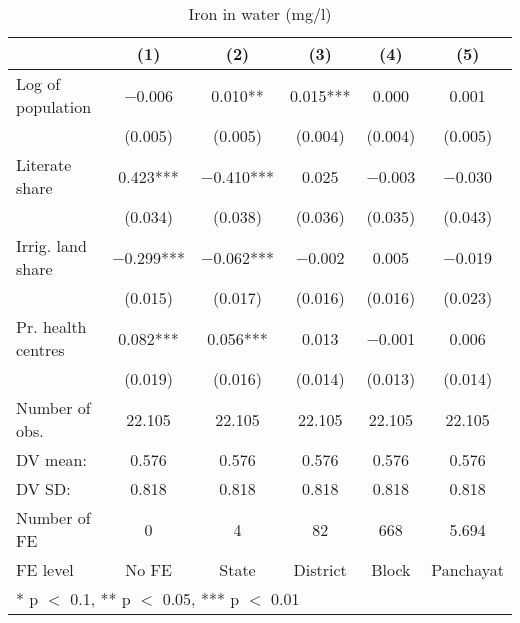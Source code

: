 \begin{table}

\caption{\label{tab:}Iron in water (mg/l)}
\centering
\begin{tabular}[t]{lccccc}
\toprule
  & (1) & (2) & (3) & (4) & (5)\\
\midrule
Log of population & \num{-0.006} & \num{0.010}** & \num{0.015}*** & \num{0.000} & \num{0.001}\\
 & (\num{0.005}) & (\num{0.005}) & (\num{0.004}) & (\num{0.004}) & (\num{0.005})\\
Literate share & \num{0.423}*** & \num{-0.410}*** & \num{0.025} & \num{-0.003} & \num{-0.030}\\
 & (\num{0.034}) & (\num{0.038}) & (\num{0.036}) & (\num{0.035}) & (\num{0.043})\\
Irrig. land share & \num{-0.299}*** & \num{-0.062}*** & \num{-0.002} & \num{0.005} & \num{-0.019}\\
 & (\num{0.015}) & (\num{0.017}) & (\num{0.016}) & (\num{0.016}) & (\num{0.023})\\
Pr. health centres & \num{0.082}*** & \num{0.056}*** & \num{0.013} & \num{-0.001} & \num{0.006}\\
 & (\num{0.019}) & (\num{0.016}) & (\num{0.014}) & (\num{0.013}) & (\num{0.014})\\
\midrule
Number of obs. & \num{22,105} & \num{22,105} & \num{22,105} & \num{22,105} & \num{22,105}\\
DV mean: & \num{0.576} & \num{0.576} & \num{0.576} & \num{0.576} & \num{0.576}\\
DV SD: & \num{0.818} & \num{0.818} & \num{0.818} & \num{0.818} & \num{0.818}\\
Number of FE & \num{0} & \num{4} & \num{82} & \num{668} & \num{5,694}\\
FE level & No FE & State & District & Block & Panchayat\\
\bottomrule
\multicolumn{6}{l}{\rule{0pt}{1em}* p $<$ 0.1, ** p $<$ 0.05, *** p $<$ 0.01}\\
\end{tabular}
\end{table}
